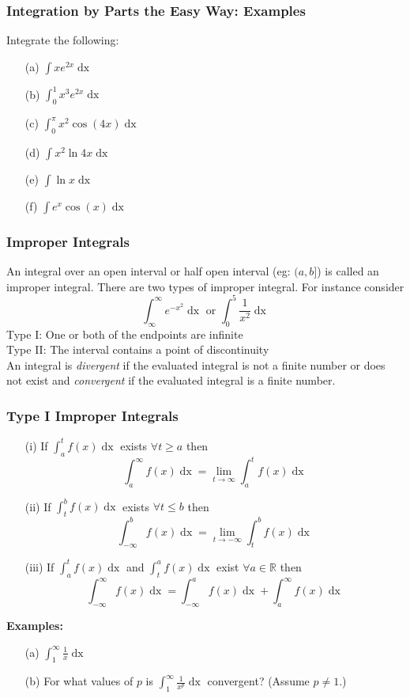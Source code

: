 \documentclass{beamer}
\begin{document}
\begin{frame}
\frametitle{Integration by Parts the Easy Way: Examples}
Integrate the following:
\begin{itemize}
	\item[(a)] $\int xe^{2x} \mathop{dx}$
	\item[(b)] $ \int_0^1 x^3 e^{2x} \mathop{dx}$
	\item[(c)] $\int_0^\pi x^2 \cos(4x) \mathop{dx}$
	\item[(d)]  $\int x^2 \ln 4x \mathop{dx} $
	\item[(e)] $\int \ln x \mathop{dx}$
	\item[(f)] $\int e^x \cos(x) \mathop{dx}$
\end{itemize}
\end{frame}

\begin{frame}
\frametitle{Improper Integrals}
An integral over an open interval or half open interval (eg: $(a,b]$) is called an improper integral. There are two types of improper integral. For instance consider
$$\int_{\infty}^{\infty} e^{-x^2} \mathop{dx} \mbox{ or } \int_0^5 \frac{1}{x^2} \mathop{dx}$$
Type I: One or both of the endpoints are infinite\\
Type II: The interval contains a point of discontinuity\\

\vspace{6pt}
An integral is \textit{divergent} if the evaluated integral is not a finite number or does not exist and \textit{convergent} if the evaluated integral is a finite number.
\end{frame}

\begin{frame}
\frametitle{Type I Improper Integrals}
\begin{itemize}
	\item[(i)] If $\int_{a}^{t} f(x) \mathop{dx}$ exists $\forall t \geq a$ then
	$$\int_{a}^{\infty}f(x) \mathop{dx} = \lim\limits_{t \to \infty} \int_a^tf(x) \mathop{dx}$$
	\item[(ii)] If $\int_{t}^{b} f(x) \mathop{dx}$ exists $\forall t \leq b$ then
	$$\int_{-\infty}^{b}f(x) \mathop{dx} = \lim\limits_{t \to -\infty} \int_t^bf(x) \mathop{dx}$$
	\item[(iii)] If  $\int_{a}^{t} f(x) \mathop{dx}$ and $\int_{t}^{a} f(x) \mathop{dx}$ exist $\forall a \in \mathbb{R}$ then
	$$\int_{-\infty}^\infty f(x) \mathop{dx} = \int_{-\infty}^a f(x) \mathop{dx} + \int_{a}^\infty f(x) \mathop{dx}$$
\end{itemize}

\vspace{6pt}
\textbf{Examples:}
\begin{itemize}
	\item[(a)] $\int_{1}^{\infty}\frac{1}{x} \mathop{dx}$
	\item[(b)] For what values of $p$ is $\int_{1}^{\infty}\frac{1}{x^p} \mathop{dx}$ convergent? (Assume $p \neq 1$.)
\end{itemize}
\end{frame}
\end{document}
